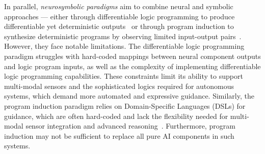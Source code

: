 
In parallel, \textit{neurosymbolic paradigms} aim to combine neural and symbolic approaches --- either through differentiable logic programming to produce differentiable yet deterministic outputs~\cite{li2023scallop,raghothamandifflog} or through program induction to synthesize deterministic programs by observing limited input-output pairs~\cite{parisotto2016neuro,bjorner2023formal,ellis2021dreamcoder}. However, they face notable limitations. The differentiable logic programming paradigm struggles with hard-coded mappings between neural component outputs and logic program inputs, as well as the complexity of implementing differentiable logic programming capabilities. These constraints limit its ability to support multi-modal sensors and the sophisticated logics required for autonomous systems, which demand more automated and expressive guidance. Similarly, the program induction paradigm relies on Domain-Specific Languages (DSLs) for guidance, which are often hard-coded and lack the flexibility needed for multi-modal sensor integration and advanced reasoning~\cite{parisotto2016neuro,ellis2021dreamcoder,bjorner2023formal}. Furthermore, program induction may not be sufficient to replace all pure AI components in such systems.

